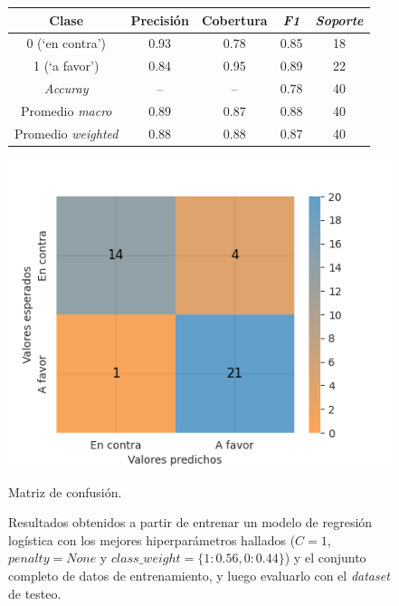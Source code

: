 \begin{figure}
    \begin{minipage}[b]{.6\linewidth}
    \centering
        \begin{adjustbox}{max width=\textwidth}
        \begin{tabular}{ *{5}{|c}| }
        \hline
        Clase & Precisi\'on & Cobertura & \textit{F1} & \textit{Soporte} \\
        \hline{} (`en contra') & 0.93 & 0.78 & 0.85 & 18 \\
         (`a favor') & 0.84 & 0.95 & 0.89  & 22 \\
        \hline\hline
        \textit{Accuray} & {--} & {--} & 0.78 & 40 \\
        \hline
        Promedio \textit{macro} & 0.89 & 0.87 & 0.88 & 40 \\
        \hline
        Promedio \textit{weighted} & 0.88 & 0.88 & 0.87 & 40 \\
        \hline
        \end{tabular}
        \end{adjustbox}
        \label{table-results-models-held-out}
    \end{minipage}\hfill
    \begin{minipage}[t]{.35\linewidth}
      \centering
        \includegraphics[scale=0.4]{./images/graphs/confussion_matrix.png}
        \caption{Matriz de confusi\'on.}
        \label{fig-results-models-held-out}
    \end{minipage}
    \caption*{Resultados obtenidos a partir de entrenar un modelo de
    regresi\'on log\'istica con los mejores hiperpar\'ametros hallados
    ($C=1$, $penalty=None$ y $class\_weight=\lbrace1:0.56,0:0.44\rbrace$)
    y el conjunto completo de datos de entrenamiento,
    y luego evaluarlo con el \textit{dataset} de testeo.}
  \end{figure}

